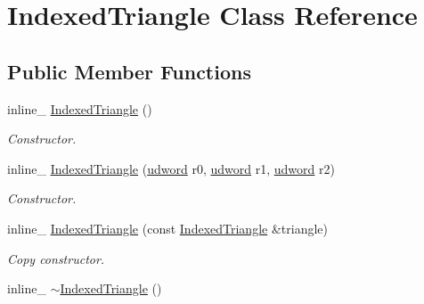 \hypertarget{class_indexed_triangle}{\section{Indexed\+Triangle Class Reference}
\label{class_indexed_triangle}
}
\subsection*{Public Member Functions}
\begin{DoxyCompactItemize}
\item 
\hypertarget{class_indexed_triangle_ac90c80ffc51dfa77d1bd9ca619cece86}{inline\+\_\+ \hyperlink{class_indexed_triangle_ac90c80ffc51dfa77d1bd9ca619cece86}{Indexed\+Triangle} ()}\label{class_indexed_triangle_ac90c80ffc51dfa77d1bd9ca619cece86}

\begin{DoxyCompactList}\small\item\em Constructor. \end{DoxyCompactList}\item 
\hypertarget{class_indexed_triangle_a220b47bc4a43331b97cb40568f3e6943}{inline\+\_\+ \hyperlink{class_indexed_triangle_a220b47bc4a43331b97cb40568f3e6943}{Indexed\+Triangle} (\hyperlink{_ice_types_8h_a44c6f1920ba5551225fb534f9d1a1733}{udword} r0, \hyperlink{_ice_types_8h_a44c6f1920ba5551225fb534f9d1a1733}{udword} r1, \hyperlink{_ice_types_8h_a44c6f1920ba5551225fb534f9d1a1733}{udword} r2)}\label{class_indexed_triangle_a220b47bc4a43331b97cb40568f3e6943}

\begin{DoxyCompactList}\small\item\em Constructor. \end{DoxyCompactList}\item 
\hypertarget{class_indexed_triangle_a8353fbe1e859fd657fef6e53afbd6715}{inline\+\_\+ \hyperlink{class_indexed_triangle_a8353fbe1e859fd657fef6e53afbd6715}{Indexed\+Triangle} (const \hyperlink{class_indexed_triangle}{Indexed\+Triangle} \&triangle)}\label{class_indexed_triangle_a8353fbe1e859fd657fef6e53afbd6715}

\begin{DoxyCompactList}\small\item\em Copy constructor. \end{DoxyCompactList}\item 
\hypertarget{class_indexed_triangle_ac942c3fa7f0b31c0f8794f14f76afd3d}{inline\+\_\+ \hyperlink{class_indexed_triangle_ac942c3fa7f0b31c0f8794f14f76afd3d}{$\sim$\+Indexed\+Triangle} ()}\label{class_indexed_triangle_ac942c3fa7f0b31c0f8794f14f76afd3d}


\end{DoxyCompactItemize}
